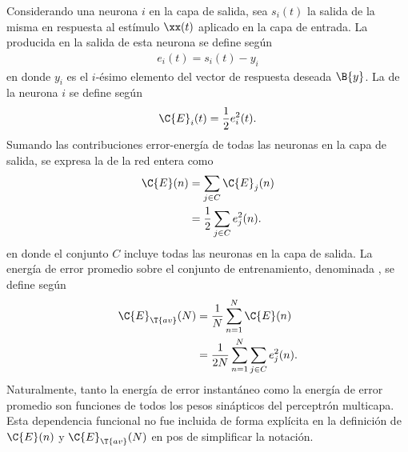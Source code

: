 Considerando una neurona $i$ en la capa de salida, sea $s_i(t)$ la
salida de la misma en respuesta al estímulo $\xx(t)$ aplicado en la
capa de entrada. La  producida en la salida de esta
neurona se define según
%
\begin{align}\label{4.2}
  e_i(t)=s_{i}(t)-y_{i}
\end{align}
%
en donde $y_{i}$ es el $i$-ésimo elemento del vector de respuesta
deseada $\B{y}$. La  de la neurona
$i$ se define según
%
\begin{align}
\label{4.3}
  \C{E}_i(t)=\frac{1}{2}e^2_i(t).
\end{align}
%
Sumando las contribuciones error-energía de todas las neuronas en la
capa de salida, se expresa la 
de la red entera como
%
\begin{align}
\label{4.4}
  \C{E}(n)&=\sum_{j\in C}\C{E}_j(n) \\
  &=\frac{1}{2}\sum_{j\in C}e^2_j(n).
\end{align}
%
en donde el conjunto $C$ incluye todas las neuronas en la capa de
salida. La energía de error promedio sobre el conjunto de entrenamiento,
denominada , se define según
%
\begin{align}
\label{4.5}
  \C{E}_{\T{av}}(N)&=\frac{1}{N}\sum_{n=1}^N\C{E}(n) \\
  &=\frac{1}{2N} \sum_{n=1}^N \sum_{j\in C}e^2_j(n).
\end{align}
%
Naturalmente, tanto la energía de error instantáneo como la energía de
error promedio son funciones de todos los pesos sinápticos del
perceptrón multicapa. Esta dependencia funcional no fue incluida de
forma explícita en la definición de $\C{E}(n)$ y $\C{E}_{\T{av}}(N)$
en pos de simplificar la notación.
%
